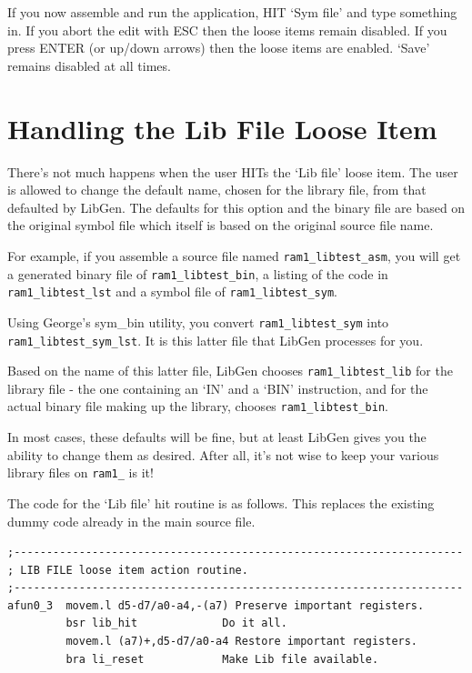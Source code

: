 If you now assemble and run the application, HIT `Sym file' and type
    something in. If you abort the edit with ESC then the loose items remain
    disabled. If you press ENTER (or up/down arrows) then the loose items are
    enabled. `Save' remains disabled at all times.

\section{Handling the Lib File Loose Item}
\label{ch32-handling-lib-file}%

There's not much happens when the user HITs the `Lib file' loose
    item. The user is allowed to change the default name, chosen for the
    library file, from that defaulted by LibGen.
    The defaults for this option and the binary file are based on the original
    symbol file which itself is based on the original source file name.

For example, if you assemble a source file named
 \nolinkurl{ram1_libtest_asm}, you will get a generated binary
    file of \nolinkurl{ram1_libtest_bin}, a listing of the code in
 \nolinkurl{ram1_libtest_lst} and a symbol file of
 \nolinkurl{ram1_libtest_sym}.

Using George's sym\_bin utility, you
    convert \nolinkurl{ram1_libtest_sym} into
 \nolinkurl{ram1_libtest_sym_lst}. It is this latter file that
 LibGen processes for you.

Based on the name of this latter file, LibGen chooses
 \nolinkurl{ram1_libtest_lib} for the library file -{} the one
    containing an `IN' and a `BIN' instruction, and for the actual binary file
    making up the library, chooses
 \nolinkurl{ram1_libtest_bin}.

In most cases, these defaults will be fine, but at least
 LibGen gives you the ability to change them as
    desired. After all, it's not wise to keep your various library files on
 \nolinkurl{ram1_} is it!

The code for the `Lib file' hit routine is as follows. This replaces
    the existing dummy code already in the main source file.

\begin{lstlisting}[firstnumber=1,]
;---------------------------------------------------------------------
; LIB FILE loose item action routine.
;---------------------------------------------------------------------
afun0_3  movem.l d5-d7/a0-a4,-(a7) Preserve important registers.
         bsr lib_hit             Do it all.
         movem.l (a7)+,d5-d7/a0-a4 Restore important registers.
         bra li_reset            Make Lib file available.
\end{lstlisting}

